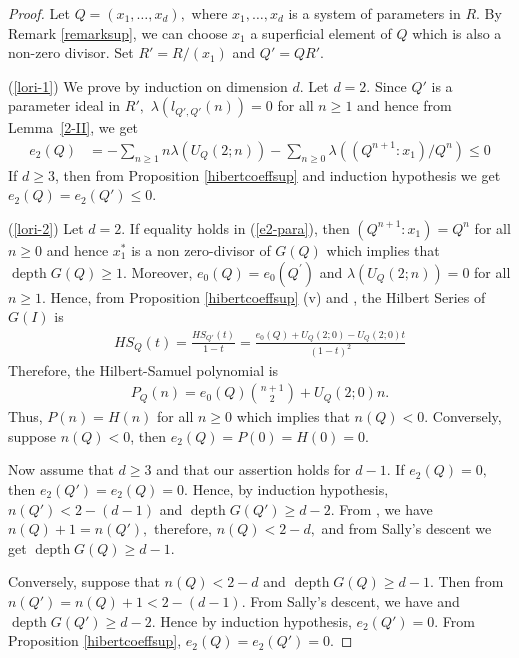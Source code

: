 \documentclass[reqno,a4paper,dvipsnames]{amsart}
\newcommand{\depth}{\operatorname{depth}}
\theoremstyle{definition}
\begin{document}
\begin{proof}
Let $Q=(x_{1},\ldots,x_{d}),$ where $x_{1},\ldots,x_{d}$ is a system of parameters in $R.$ By Remark \ref{remarksup}, we can choose $x_{1} $  a superficial element of $Q$ which is also a non-zero divisor. Set $R'=R/(x_{1})$ and $Q'=QR'.$

(\ref{lori-1})
We prove by induction on dimension $d$. Let   $d=2$. Since $Q'$ is a parameter ideal in $R',$  $\lambda(l_{Q',Q'}(n))=0$ for all $n\geq 1$ and hence from  Lemma~\ref{2-II}, we get
\begin{align}
 \label{e2-para} 
       e_{2}(Q)
&= - \displaystyle\sum_{n \geq 1} n\lambda(U_{Q}(2;n))
-  \displaystyle \sum_{n\geq 0}\lambda((Q^{n+1}:x_{1})/Q^{n})
\leq
 0 
    \end{align}
If $d\geq 3$, then from Proposition \ref{hibertcoeffsup} and induction hypothesis  we get $e_{2}(Q)=e_{2}(Q') \leq 0.$ 

(\ref{lori-2})
Let $d=2$. If   equality holds in  (\ref{e2-para}), then $(Q^{n+1}:x_1) = Q^n$  for all $n \geq 0$ and hence 
$x_{1}^{*}$ is a non zero-divisor of $G(Q)$   which implies that  $\depth G(Q)\geq 1.$   Moreover, $e_0(Q) = e_0(Q^{\prime})$ and $\lambda 
(U_{Q} (2;n)) = 0$ for all $n \geq 1$. Hence, from Proposition \ref{hibertcoeffsup} (v) and \cite[2.4, page 21]
{rv},  the Hilbert Series of $G(I)$ is 
  \begin{eqnarray*}
   HS_{Q}(t) 
   = \frac{HS_{Q'}(t)} {1-t} =\frac{e_0(Q) + U_{Q}(2;0) - U_{Q}(2;0) t}{(1-t)^2}
     \end{eqnarray*}
 Therefore, the Hilbert-Samuel polynomial is
 \begin{eqnarray*}
  P_{Q}(n)=e_{0}(Q)\binom{n+1}{2}+U_{Q}(2;0)n.
 \end{eqnarray*}
Thus, $P(n) = H(n)$ for all $n \geq 0$ which implies that  $n(Q)<0.$ 
  Conversely, suppose $n(Q)<0$, then $e_{2}(Q)= P(0) = H(0)=0 $. 
 

Now assume that  $d \geq 3$ and that our assertion holds for $d-1.$ If  $e_{2}(Q)=0,$ then $e_{2}(Q')=e_2(Q) =0$. 
 Hence, by  induction hypothesis, $n(Q') < 2-(d-1)$ and  $\depth G(Q') \geq d-2$. 
From \cite[Lemma 2.8]{marley}, we have $n(Q)+1=n(Q'),$ therefore, $n(Q)<2-d,$  and from Sally's descent we get $\depth G(Q) \geq d-1$. 

 Conversely, suppose that $n(Q)<2-d$ and $\depth G(Q) \geq d-1.$ Then from \cite[Lemma 2.8]{marley} $n(Q')=n(Q)+1<2-(d-1)$. From Sally's descent, we have  and $\depth G(Q')\geq d-2$. Hence by induction hypothesis, $e_{2}(Q')=0.$ From Proposition \ref{hibertcoeffsup}, $e_{2}(Q)=e_{2}(Q')=0.$
 

\end{proof}
\end{document}
